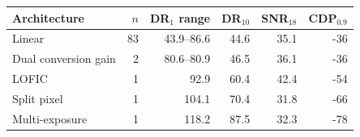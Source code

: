 \begin{tabular}{@{}lrrrrr@{}}
\toprule
Architecture & $n$ & DR$_1$ range & DR$_{10}$ & SNR$_{18}$ & CDP$_{0.9}$ \\
\midrule
Linear & 83 & 43.9--86.6 & 44.6 & 35.1 & -36 \\
Dual conversion gain & 2 & 80.6--80.9 & 46.5 & 36.1 & -36 \\
LOFIC & 1 & 92.9 & 60.4 & 42.4 & -54 \\
Split pixel & 1 & 104.1 & 70.4 & 31.8 & -66 \\
Multi-exposure & 1 & 118.2 & 87.5 & 32.3 & -78 \\
\bottomrule
\end{tabular}

